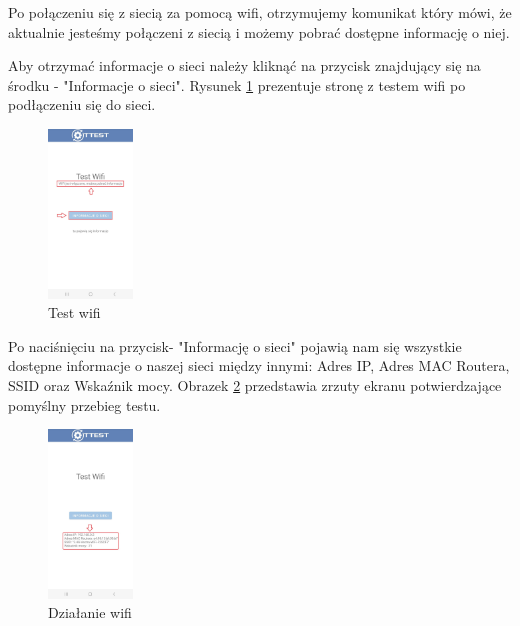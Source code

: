 \newpage


Po połączeniu się z siecią za pomocą wifi, otrzymujemy komunikat który mówi, że aktualnie jesteśmy połączeni z siecią i możemy pobrać dostępne informację o niej. 

Aby otrzymać informacje o sieci należy kliknąć na przycisk znajdujący się na środku - "Informacje o sieci".
\newline
Rysunek \ref{rys:wifi2} prezentuje stronę z testem wifi po podłączeniu się do sieci.

\begin{figure}[!hbt]
	\begin{center}
		\includegraphics[angle=360, width=0.20\textwidth]{rys/punkt6/wifi2}
		\caption{Test wifi}
		\label{rys:wifi2}
	\end{center}
\end{figure}

Po naciśnięciu na przycisk- "Informację o sieci" pojawią nam się wszystkie dostępne informacje o naszej sieci między innymi: Adres IP, Adres MAC Routera, SSID oraz Wskaźnik mocy.
\newline
Obrazek \ref{rys:wifi3} przedstawia zrzuty ekranu potwierdzające pomyślny przebieg testu.

\begin{figure}[!hbt]
	\begin{center}
		\includegraphics[angle=360, width=0.20\textwidth]{rys/punkt6/wifi3}
		\caption{Działanie wifi}
		\label{rys:wifi3}
	\end{center}
\end{figure}


